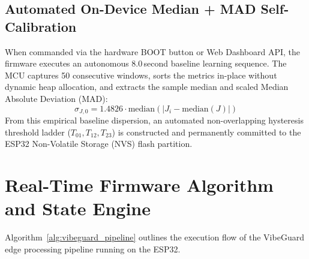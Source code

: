 \subsection{Automated On-Device Median + MAD Self-Calibration}
\hspace{2em}When commanded via the hardware BOOT button or Web Dashboard API, the firmware executes an autonomous 8.0\,second baseline learning sequence. The MCU captures 50 consecutive windows, sorts the metrics in-place without dynamic heap allocation, and extracts the sample median and scaled Median Absolute Deviation (MAD):
\begin{equation}
\sigma_{J,0} = 1.4826 \cdot \mathrm{median}\left( |J_i - \mathrm{median}(J)| \right)
\end{equation}
From this empirical baseline dispersion, an automated non-overlapping hysteresis threshold ladder ($T_{01}, T_{12}, T_{23}$) is constructed and permanently committed to the ESP32 Non-Volatile Storage (NVS) flash partition.

\section{Real-Time Firmware Algorithm and State Engine}
\hspace{2em}Algorithm~\ref{alg:vibeguard_pipeline} outlines the execution flow of the VibeGuard edge processing pipeline running on the ESP32.

